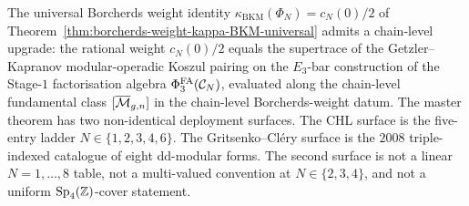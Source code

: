 The universal Borcherds weight identity
$\kappa_{\mathrm{BKM}}(\Phi_N) = c_N(0)/2$ of
Theorem~\ref{thm:borcherds-weight-kappa-BKM-universal} admits a
chain-level upgrade: the rational weight $c_N(0)/2$ equals the
supertrace of the Getzler--Kapranov modular-operadic Koszul pairing on
the $E_3$-bar construction of the Stage-$1$ factorisation algebra
$\Phi^{\mathrm{FA}}_{3}(\mathcal{C}_N)$, evaluated along the chain-level fundamental
class $[\overline{\mathcal{M}}_{g, n}]$ in the chain-level Borcherds-weight datum. The master
theorem has two non-identical deployment surfaces. The CHL surface is
the five-entry ladder $N \in \{1, 2, 3, 4, 6\}$. The
Gritsenko--Cl\'ery surface is the $2008$ triple-indexed catalogue of
eight dd-modular forms. The second surface is not a linear
$N = 1,\ldots,8$ table, not a multi-valued convention at
$N \in \{2, 3, 4\}$, and not a uniform $\mathrm{Sp}_{4}(\mathbb{Z})$-cover statement.

